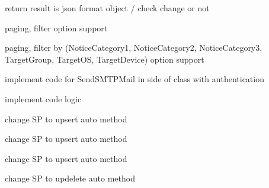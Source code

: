 \begin{DoxyRefList}
\item[\label{todo__todo000010}%
\hypertarget{todo__todo000010}{}%
File \hyperlink{_c_b_sel_login_i_d_dupe_check_controller_8cs}{C\+B\+Sel\+Login\+I\+D\+Dupe\+Check\+Controller.cs} ]return result is json format object / check change or not  
\item[\label{todo__todo000011}%
\hypertarget{todo__todo000011}{}%
File \hyperlink{_c_b_sel_member_game_info_stages_controller_8cs}{C\+B\+Sel\+Member\+Game\+Info\+Stages\+Controller.cs} ]paging, filter option support  
\item[\label{todo__todo000012}%
\hypertarget{todo__todo000012}{}%
File \hyperlink{_c_b_sel_notices_controller_8cs}{C\+B\+Sel\+Notices\+Controller.cs} ]paging, filter by (Notice\+Category1, Notice\+Category2, Notice\+Category3, Target\+Group, Target\+OS, Target\+Device) option support  
\item[\label{todo__todo000013}%
\hypertarget{todo__todo000013}{}%
File \hyperlink{_c_b_sel_send_email_to_member_controller_8cs}{C\+B\+Sel\+Send\+Email\+To\+Member\+Controller.cs} ]implement code for Send\+S\+M\+T\+P\+Mail in side of class with authentication  
\item[\label{todo__todo000014}%
\hypertarget{todo__todo000014}{}%
File \hyperlink{_c_b_udt_confirmed_email_address_controller_8cs}{C\+B\+Udt\+Confirmed\+Email\+Address\+Controller.cs} ]implement code logic  
\item[\label{todo__todo000015}%
\hypertarget{todo__todo000015}{}%
File \hyperlink{_c_b_udt_coupon_member_controller_8cs}{C\+B\+Udt\+Coupon\+Member\+Controller.cs} ]change SP to upsert auto method  
\item[\label{todo__todo000016}%
\hypertarget{todo__todo000016}{}%
File \hyperlink{_c_b_udt_game_event_member_to_item_controller_8cs}{C\+B\+Udt\+Game\+Event\+Member\+To\+Item\+Controller.cs} ]change SP to upsert auto method  
\item[\label{todo__todo000017}%
\hypertarget{todo__todo000017}{}%
File \hyperlink{_c_b_udt_move_gift_controller_8cs}{C\+B\+Udt\+Move\+Gift\+Controller.cs} ]change SP to upsert auto method  
\item[\label{todo__todo000018}%
\hypertarget{todo__todo000018}{}%
File \hyperlink{_c_d_udt_return_item_controller_8cs}{C\+D\+Udt\+Return\+Item\+Controller.cs} ]change SP to updelete auto method 
\end{DoxyRefList}